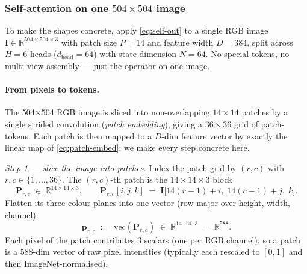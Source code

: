 \documentclass[11pt,a4paper]{article}
\begin{document}
\subsubsection{Self-attention on one \texorpdfstring{$504\!\times\!504$}{504x504} image}
\label{sec:self-worked}

To make the shapes concrete, apply \eqref{eq:self-out} to a single RGB
image $\bm{I}\in\mathbb{R}^{504\times 504\times 3}$ with patch size
$P=14$ and feature width $D=384$, split across $H=6$ heads
($d_{\text{head}}=64$) with state dimension $N=64$. No special tokens,
no multi-view assembly — just the operator on one image.

\paragraph{From pixels to tokens.}
The 504$\times$504 RGB image is sliced into non-overlapping
$14\!\times\!14$ patches by a single strided convolution
(\emph{patch embedding}), giving a $36\!\times\!36$ grid of
patch-tokens. Each patch is then mapped to a $D$-dim feature vector
by exactly the linear map of \eqref{eq:patch-embed}; we make every
step concrete here.

\medskip
\noindent\emph{Step 1 — slice the image into patches.}
Index the patch grid by $(r, c)$ with $r, c \in \{1, \dots, 36\}$.
The $(r, c)$-th patch is the $14\!\times\!14\!\times\!3$ block
\begin{equation}
  \bm{P}_{r,c} \;\in\; \mathbb{R}^{14\times 14\times 3},
  \qquad
  \bm{P}_{r,c}[i, j, k] \;=\; \bm{I}\bigl[14(r{-}1){+}i,\; 14(c{-}1){+}j,\; k\bigr].
\end{equation}
Flatten its three colour planes into one vector (row-major over
height, width, channel):
\begin{equation}
  \bm{p}_{r,c} \;:=\; \mathrm{vec}(\bm{P}_{r,c})
   \;\in\; \mathbb{R}^{14 \cdot 14 \cdot 3} \;=\; \mathbb{R}^{588}.
\end{equation}
Each pixel of the patch contributes 3 scalars (one per RGB channel),
so a patch is a $588$-dim vector of raw pixel intensities (typically
each rescaled to $[0, 1]$ and then ImageNet-normalised).
\end{document}
